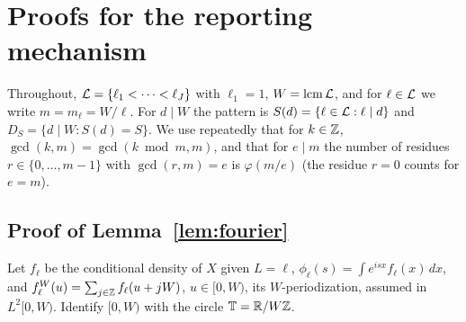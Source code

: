 
\section{Proofs for the reporting mechanism}\label{supp:mech}

Throughout, $\mathcal{L}=\{\ell_1<\cdots<\ell_J\}$ with $\ell_1=1$, $W=\operatorname{lcm}\mathcal{L}$, and for $\ell\in\mathcal{L}$ we write $m=m_\ell=W/\ell$. For $d\mid W$ the pattern is $S(d)=\{\ell\in\mathcal{L}:\ell\mid d\}$ and $D_S=\{d\mid W:S(d)=S\}$. We use repeatedly that for $k\in\mathbb{Z}$, $\gcd(k,m)=\gcd(k\bmod m,m)$, and that for $e\mid m$ the number of residues $r\in\{0,\dots,m-1\}$ with $\gcd(r,m)=e$ is $\varphi(m/e)$ (the residue $r=0$ counts for $e=m$).

\subsection{Proof of Lemma~\ref{lem:fourier}}

Let $f_\ell$ be the conditional density of $X$ given $L=\ell$, $\phi_\ell(s)=\int e^{isx}f_\ell(x)\,dx$, and $f^W_\ell(u)=\sum_{j\in\mathbb{Z}}f_\ell(u+jW)$, $u\in[0,W)$, its $W$-periodization, assumed in $L^2[0,W)$. Identify $[0,W)$ with the circle $\mathbb T=\mathbb{R}/W\mathbb{Z}$.

